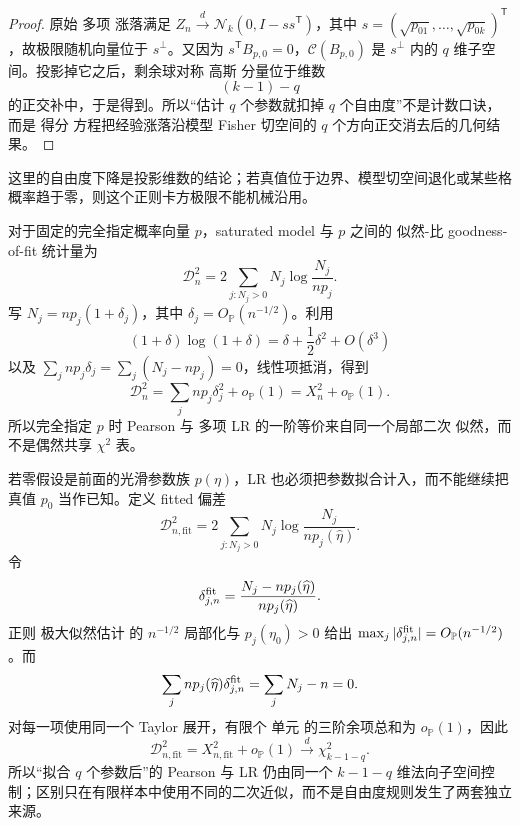 \begin{proof}
原始 多项 涨落满足 $Z_n\xrightarrow{d}\mathcal N_k(0,I-ss^{\mathsf T})$，其中 $s=(\sqrt{p_{01}},\ldots,\sqrt{p_{0k}})^{\mathsf T}$，故极限随机向量位于 $s^\perp$。又因为 $s^{\mathsf T}B_{p,0}=0$，$\mathcal C(B_{p,0})$ 是 $s^\perp$ 内的 $q$ 维子空间。投影掉它之后，剩余球对称 高斯 分量位于维数
\[
 (k-1)-q
\]
的正交补中，于是得到。所以“估计 $q$ 个参数就扣掉 $q$ 个自由度”不是计数口诀，而是 得分 方程把经验涨落沿模型 Fisher 切空间的 $q$ 个方向正交消去后的几何结果。
\end{proof}

这里的自由度下降是投影维数的结论；若真值位于边界、模型切空间退化或某些格概率趋于零，则这个正则卡方极限不能机械沿用。

\begin{proposition}
对于固定的完全指定概率向量 $p$，saturated model 与 $p$ 之间的 似然-比 goodness-of-fit 统计量为
\[
 \mathcal D_n^{2}
 =2\sum_{j:N_j>0}
 N_j\log\frac{N_j}{np_j}.
\]
写 $N_j=np_j(1+\delta_j)$，其中 $\delta_j=O_{\mathbb P}(n^{-1/2})$。利用
\[
 (1+\delta)\log(1+\delta)
 =\delta+\frac12\delta^2+O(\delta^3)
\]
以及 $\sum_jnp_j\delta_j=\sum_j(N_j-np_j)=0$，线性项抵消，得到
\[
 \mathcal D_n^{2}
 =\sum_jnp_j\delta_j^2+o_{\mathbb P}(1)
 =X_n^2+o_{\mathbb P}(1).
\]
所以完全指定 $p$ 时 Pearson 与 多项 LR 的一阶等价来自同一个局部二次 似然，而不是偶然共享 $\chi^2$ 表。

若零假设是前面的光滑参数族 $p(\eta)$，LR 也必须把参数拟合计入，而不能继续把真值 $p_0$ 当作已知。定义 fitted 偏差
\begin{equation*}\mathcal D_{n,\mathrm{fit}}^{2}
 =2\sum_{j:N_j>0}
 N_j\log\frac{N_j}{n p_j(\widehat\eta)}.
\end{equation*}
令
\[
 \delta_{j,n}^{\rm fit}
 =\frac{N_j-np_j(\widehat\eta)}{np_j(\widehat\eta)}.
\]
正则 极大似然估计 的 $n^{-1/2}$ 局部化与 $p_j(\eta_0)>0$ 给出 $\max_j|\delta_{j,n}^{\rm fit}|=O_{\mathbb P}(n^{-1/2})$。而
\[
 \sum_jnp_j(\widehat\eta)\delta_{j,n}^{\rm fit}
 =\sum_jN_j-n=0.
\]
对每一项使用同一个 Taylor 展开，有限个 单元 的三阶余项总和为 $o_{\mathbb P}(1)$，因此
\begin{equation*}\mathcal D_{n,\mathrm{fit}}^{2}
 =X_{n,\mathrm{fit}}^2+o_{\mathbb P}(1)
 \xrightarrow{d}\chi^2_{k-1-q}.
\end{equation*}
所以“拟合 $q$ 个参数后”的 Pearson 与 LR 仍由同一个 $k-1-q$ 维法向子空间控制；区别只在有限样本中使用不同的二次近似，而不是自由度规则发生了两套独立来源。
\end{proposition}

